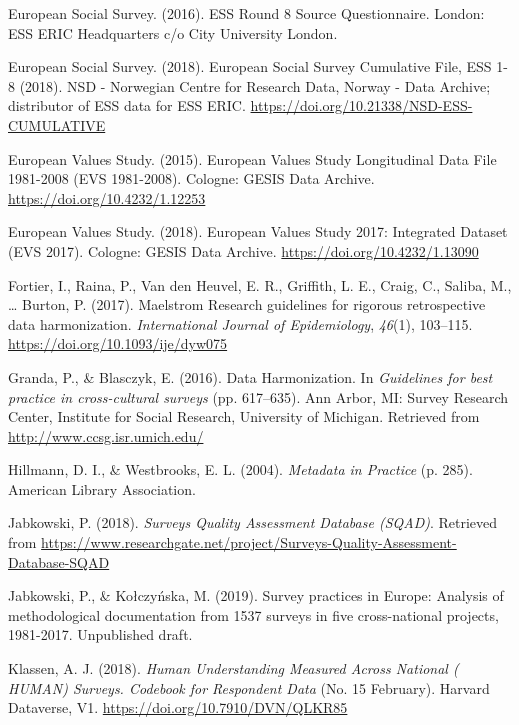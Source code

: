 \documentclass[12pt,]{article}
\begin{document}
\leavevmode\hypertarget{ref-ESS2016b}{}%
European Social Survey. (2016). ESS Round 8 Source Questionnaire. London: ESS ERIC Headquarters c/o City University London.

\leavevmode\hypertarget{ref-ESS2018}{}%
European Social Survey. (2018). European Social Survey Cumulative File, ESS 1-8 (2018). NSD - Norwegian Centre for Research Data, Norway - Data Archive; distributor of ESS data for ESS ERIC. \url{https://doi.org/10.21338/NSD-ESS-CUMULATIVE}

\leavevmode\hypertarget{ref-EVS2015}{}%
European Values Study. (2015). European Values Study Longitudinal Data File 1981-2008 (EVS 1981-2008). Cologne: GESIS Data Archive. \url{https://doi.org/10.4232/1.12253}

\leavevmode\hypertarget{ref-EVS2018}{}%
European Values Study. (2018). European Values Study 2017: Integrated Dataset (EVS 2017). Cologne: GESIS Data Archive. \url{https://doi.org/10.4232/1.13090}

\leavevmode\hypertarget{ref-Fortier2017a}{}%
Fortier, I., Raina, P., Van den Heuvel, E. R., Griffith, L. E., Craig, C., Saliba, M., \ldots{} Burton, P. (2017). Maelstrom Research guidelines for rigorous retrospective data harmonization. \emph{International Journal of Epidemiology}, \emph{46}(1), 103--115. \url{https://doi.org/10.1093/ije/dyw075}

\leavevmode\hypertarget{ref-Granda2016}{}%
Granda, P., \& Blasczyk, E. (2016). Data Harmonization. In \emph{Guidelines for best practice in cross-cultural surveys} (pp. 617--635). Ann Arbor, MI: Survey Research Center, Institute for Social Research, University of Michigan. Retrieved from \url{http://www.ccsg.isr.umich.edu/}

\leavevmode\hypertarget{ref-Hillmann2004}{}%
Hillmann, D. I., \& Westbrooks, E. L. (2004). \emph{Metadata in Practice} (p. 285). American Library Association.

\leavevmode\hypertarget{ref-Jabkowski2018}{}%
Jabkowski, P. (2018). \emph{Surveys Quality Assessment Database (SQAD)}. Retrieved from \url{https://www.researchgate.net/project/Surveys-Quality-Assessment-Database-SQAD}

\leavevmode\hypertarget{ref-Jabkowski2019}{}%
Jabkowski, P., \& Kołczyńska, M. (2019). Survey practices in Europe: Analysis of methodological documentation from 1537 surveys in five cross-national projects, 1981-2017. Unpublished draft.

\leavevmode\hypertarget{ref-Klassen2018}{}%
Klassen, A. J. (2018). \emph{Human Understanding Measured Across National ( HUMAN) Surveys. Codebook for Respondent Data} (No. 15 February). Harvard Dataverse, V1. \url{https://doi.org/10.7910/DVN/QLKR85}
\end{document}
